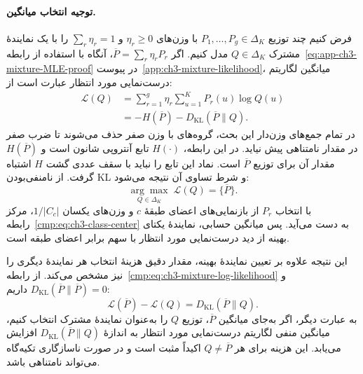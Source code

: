 \paragraph{توجیه انتخاب میانگین.}
فرض کنیم چند توزیع $P_1,\ldots,P_g\in\Delta_K$ با وزن‌های
$\eta_r\ge0$ و $\sum_r\eta_r=1$ را با یک نمایندهٔ مشترک
$Q\in\Delta_K$ مدل کنیم. اگر $\overline P=\sum_r\eta_rP_r$،
آنگاه با استفاده از رابطه~\eqref{eq:app-ch3-mixture-MLE-proof}
در پیوست~\ref{app:ch3-mixture-likelihood}، میانگین لگاریتم
درست‌نمایی مورد انتظار عبارت است از:
\begin{equation}\label{cmp:eq:ch3-mixture-log-likelihood}
\begin{aligned}
\mathcal L(Q)
&=\sum_{r=1}^{g}\eta_r\sum_{u=1}^{K}P_r(u)\log Q(u)\\
&=-H(\overline P)-D_{\mathrm{KL}}(\overline P\|Q).
\end{aligned}
\end{equation}
در تمام جمع‌های وزن‌دار این بحث، گروه‌های با وزن صفر
حذف می‌شوند تا ضرب صفر در مقدار نامتناهی پیش نیاید.
در این رابطه، $H(\cdot)$ تابع آنتروپی شانون است
و $H(\overline P)$ مقدار آن برای توزیع $\overline P$ است.
نماد این تابع را نباید با سقف عددی گشت $H$ اشتباه گرفت.
از نامنفی‌بودن KL \cite{CoverThomas2006} و
شرط تساوی آن نتیجه می‌شود:
\begin{equation}\label{cmp:eq:ch3-mixture-likelihood-optimum}
\underset{Q\in\Delta_K}{\arg\max}\;\mathcal L(Q)
=\{\overline P\}.
\end{equation}
با انتخاب $P_r$ از بازنمایی‌های اعضای طبقهٔ $c$ و وزن‌های
یکسان $1/|C_c|$، مرکز رابطه~\eqref{cmp:eq:ch3-class-center}
به دست می‌آید. پس میانگین حسابی، نمایندهٔ یکتای بهینه
از دید درست‌نمایی مورد انتظار با سهم برابر اعضای طبقه است.

این نتیجه علاوه بر تعیین نمایندهٔ بهینه، مقدار دقیق هزینهٔ
انتخاب هر نمایندهٔ دیگری را نیز مشخص می‌کند.
از رابطه~\eqref{cmp:eq:ch3-mixture-log-likelihood} و
$D_{\mathrm{KL}}(\overline P\|\overline P)=0$ داریم:
\begin{equation}\label{cmp:eq:ch3-mixture-excess-modeling-cost}
\boxed{
\mathcal L(\overline P)-\mathcal L(Q)
=D_{\mathrm{KL}}(\overline P\|Q).
}
\end{equation}
به عبارت دیگر، اگر به‌جای میانگین $\overline P$، توزیع $Q$
را به‌عنوان نمایندهٔ مشترک انتخاب کنیم، میانگین منفی
لگاریتم درست‌نمایی مورد انتظار به اندازهٔ
$D_{\mathrm{KL}}(\overline P\|Q)$ افزایش می‌یابد.
این هزینه برای هر $Q\ne\overline P$ اکیداً مثبت است
و در صورت ناسازگاری تکیه‌گاه می‌تواند نامتناهی باشد.

